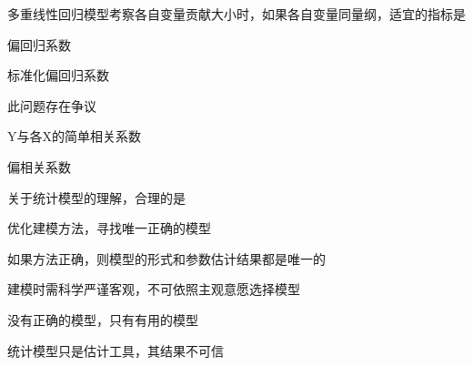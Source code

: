 \par\addvspace{6pt}\noindent\begin{minipage}{\linewidth}


多重线性回归模型考察各自变量贡献大小时，如果各自变量同量纲，适宜的指标是


\begin{choices}

\item 偏回归系数

\item 标准化偏回归系数

\item 此问题存在争议

\item Y与各X的简单相关系数

\item 偏相关系数

\end{choices}

\end{minipage}\par\vspace{4pt}

\par\addvspace{6pt}\noindent\begin{minipage}{\linewidth}


关于统计模型的理解，合理的是


\begin{choices}

\item 优化建模方法，寻找唯一正确的模型

\item 如果方法正确，则模型的形式和参数估计结果都是唯一的

\item 建模时需科学严谨客观，不可依照主观意愿选择模型

\item 没有正确的模型，只有有用的模型

\item 统计模型只是估计工具，其结果不可信

\end{choices}

\end{minipage}\par\vspace{4pt}

